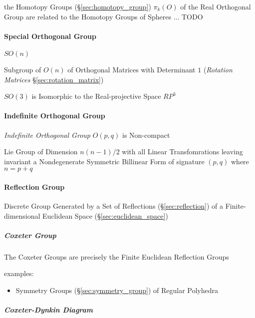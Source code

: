 the Homotopy Groups (\S\ref{sec:homotopy_group}) $\pi_k(O)$ of the Real
Orthogonal Group are related to the Homotopy Groups of Spheres
... TODO



\paragraph{Special Orthogonal Group}\label{sec:special_orthogonal_group}\hfill

$SO(n)$

Subgroup of $O(n)$ of Orthogonal Matrices with Determinant $1$ (\emph{Rotation
  Matrices} \S\ref{sec:rotation_matrix})

$SO(3)$ is Isomorphic to the Real-projective Space $RP^3$



\paragraph{Indefinite Orthogonal Group}
\label{sec:indefinite_orthogonal_group}\hfill

\emph{Indefinite Orthogonal Group} $O(p,q)$ is Non-compact

Lie Group of Dimension $n(n-1)/2$ with all Linear Transfomrations leaving
invariant a Nondegenerate Symmetric Billinear Form of signature $(p,q)$ where
$n = p+q$



\paragraph{Reflection Group}\label{sec:reflection_group}\hfill

Discrete Group Generated by a Set of Reflections (\S\ref{sec:reflection}) of a
Finite-dimensional Euclidean Space (\S\ref{sec:euclidean_space})



\subparagraph{Coxeter Group}\label{sec:coxeter_group}\hfill

The Coxeter Groups are precisely the Finite Euclidean Reflection Groups

examples:
\begin{itemize}
  \item Symmetry Groups (\S\ref{sec:symmetry_group}) of Regular Polyhedra
\end{itemize}




\subparagraph{Coxeter-Dynkin Diagram}\label{sec:coxeter_dynkin_diagram}\hfill

